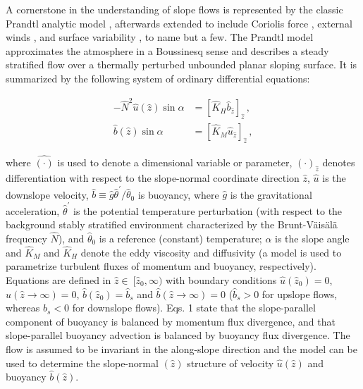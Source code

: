 A cornerstone in the understanding of slope flows is represented by the classic Prandtl analytic model \citep{Prandtl}, afterwards extended to include Coriolis force \citep{Gutman1964}, external winds \citep{Lykosov_1972}, and surface variability \citep{Shapiro2007, Oldroyd2014,Zardi2015}, to name but a few.
The Prandtl model approximates the atmosphere in a Boussinesq sense and describes a steady stratified flow over a thermally perturbed unbounded planar sloping surface. It is summarized by the following system of ordinary differential equations:
%
\begin{linenomath*}
\begin{subequations}
	\begin{align}
	- \hat{N}^2 \hat{u}(\hat{z}) \sin{\alpha} & = [ \hat{K}_H \hat{b}_{\hat{z}} ]_{\hat{z}} \, , \\
	\hat{b}(\hat{z}) \sin{\alpha} & = [ \hat{K}_M \hat{u}_{\hat{z}} ]_{\hat{z}} \, ,
	\end{align}
	\label{Prandtl_eq}
\end{subequations}
\end{linenomath*}
%
where $\hat{(\cdot)}$ is used to denote a dimensional variable or parameter, $(\cdot)_{\hat{z}}$ denotes differentiation with respect to the slope-normal coordinate direction $\hat{z}$, $\hat{u}$ is the downslope velocity, $\hat{b} \equiv \hat{g} \hat{\theta}^{\prime} / \hat{\theta}_0$ is buoyancy, where $\hat{g}$ is the gravitational acceleration, $\hat{\theta}^{\prime}$ is the potential temperature perturbation (with respect to the background stably stratified environment characterized by the Brunt-V\"ais\"al\"a frequency $\hat{N}$), and $\hat{\theta}_0$ is a reference (constant) temperature; $\alpha$ is the slope angle and $\hat{K}_M$ and $\hat{K}_H$ denote the eddy viscosity and diffusivity (a model is used to parametrize turbulent fluxes of momentum and buoyancy, respectively).
Equations are defined in $\hat{z} \in \ [\hat{z}_0,\infty)$ with boundary conditions $\hat{u}(\hat{z}_0)=0$, $\hat{u}(\hat{z} \rightarrow \infty) = 0$, $\hat{b}(\hat{z}_0)=\hat{b}_s$ and $\hat{b}(\hat{z} \rightarrow \infty) = 0$ ($\hat{b}_s > 0$ for upslope flows, whereas $\hat{b}_s<0$ for downslope flows). 
Eqs. 1 state that the slope-parallel component of buoyancy is balanced by momentum flux divergence, and that slope-parallel buoyancy advection is balanced by buoyancy flux divergence.
The flow is assumed to be invariant in the along-slope direction and the model can be used to determine the slope-normal $(\hat{z})$ structure of velocity $\hat{u}(\hat{z})$ and buoyancy $\hat{b}(\hat{z})$.
